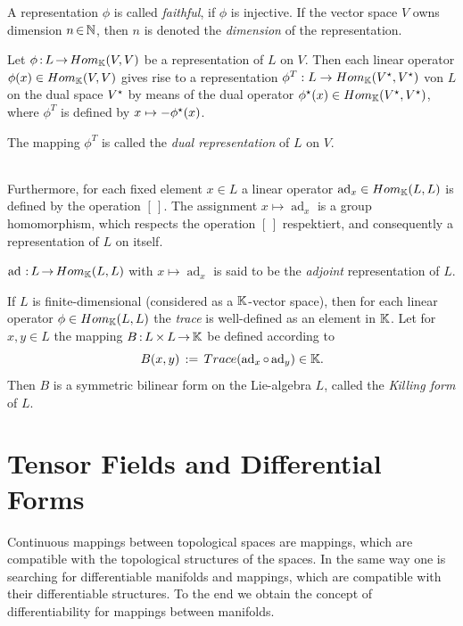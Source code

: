 \documentclass[11pt,twoside]{article}
\begin{document}
\subparagraph{}
A representation $\phi$ is called \textit{faithful}, if $\phi$ is injective.
If the vector space $V$ owns dimension $n {\,\in\,} {\mathbb{N}}$,
then $n$ is denoted the \textit{dimension} of the representation.

\subparagraph{}
Let $\phi {\,:\,} L {\,\to\,} Hom_{{\mathbb{K}}}(V,V)$ be a representation of $L$ on $V$.
Then each linear operator $\phi(x) \in Hom_{{\mathbb{K}}}(V,V)$
gives rise to a representation
$\phi^T:L \to Hom_{{\mathbb{K}}}(V^{\star},V^{\star})$ von $L$ on the dual space $V^{\star}$
by means of the dual operator $\phi^{\star}(x) \in Hom_{{\mathbb{K}}}(V^{\star},V^{\star})$,
where $\phi^T$ is defined by $x \mapsto -\phi^{\star}(x)$.

\begin{definition}
The mapping $\phi^T$ is called the \textit{dual representation} of $L$ on $V$.
\end{definition}

\paragraph{}
Furthermore,
for each fixed element $x \in L$
a linear operator
$\operatorname{ad}_x \in Hom_{{\mathbb{K}}}(L,L)$ is defined by the operation $[\,]$.
The assignment $x \mapsto \operatorname{ad}_x$ is a group homomorphism,
which respects the operation $[\,]$ respektiert,
and consequently a representation of $L$ on itself.

\begin{definition}
$\operatorname{ad} {\,:\,} L {\,\to\,} Hom_{{\mathbb{K}}}(L,L)$ with $x \mapsto \operatorname{ad}_x$
is said to be the \textit{adjoint} representation of $L$.
\end{definition}

\subparagraph{}
If $L$ is finite-dimensional (considered as a ${\mathbb{K}}$-vector space),
then for each linear operator $\phi \in Hom_{{\mathbb{K}}}(L,L)$
the \textit{trace} is well-defined as an element in ${\mathbb{K}}$.
Let for $x,y \in L$ the mapping $B {\,:\,} L {\,\times\,} L {\,\to\,} {\mathbb{K}}$ be defined according to
\[
B(x,y) \,:=\, Trace (\operatorname{ad}_x \circ \operatorname{ad}_y) \in {\mathbb{K}}.
\]
Then $B$ is a symmetric bilinear form on the Lie-algebra $L$,
called the \textit{Killing form} of $L$.

\newpage
\thispagestyle{empty}
\part{Tensor Fields and Differential Forms}                                    %
Continuous mappings between topological spaces are mappings,
which are compatible with the topological structures of the spaces.
In the same way one is searching for differentiable manifolds and mappings,
which are compatible with their differentiable structures.
To the end we obtain the concept of differentiability
for mappings between manifolds.
\end{document}
